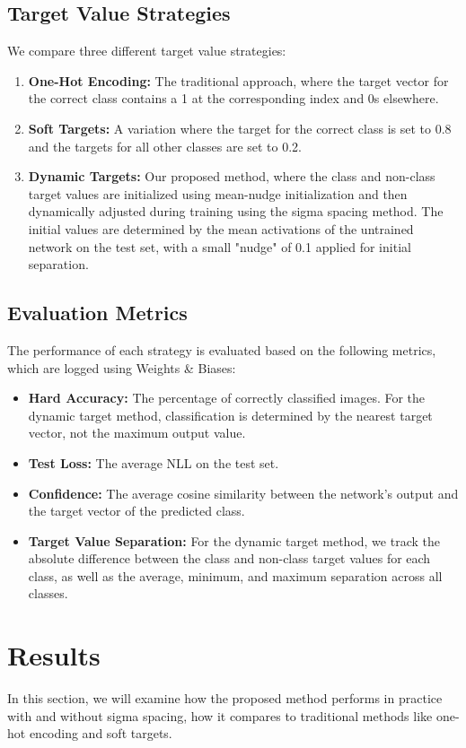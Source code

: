 \documentclass[12pt,fleqn,a4paper]{article}
\begin{document}
 \subsection{Target Value Strategies}
 We compare three different target value strategies:
 \begin{enumerate}
     \item \textbf{One-Hot Encoding:} The traditional approach, where the target vector for the correct class contains a 1 at the corresponding index and 0s elsewhere.
     \item \textbf{Soft Targets:} A variation where the target for the correct class is set to 0.8 and the targets for all other classes are set to 0.2.
     \item \textbf{Dynamic Targets:} Our proposed method, where the class and non-class target values are initialized using mean-nudge initialization and then dynamically adjusted during training using the sigma spacing method. The initial values are determined by the mean activations of the untrained network on the test set, with a small "nudge" of 0.1 applied for initial separation.
 \end{enumerate}

 \subsection{Evaluation Metrics}
 The performance of each strategy is evaluated based on the following metrics, which are logged using Weights \& Biases:
 \begin{itemize}
     \item \textbf{Hard Accuracy:} The percentage of correctly classified images. For the dynamic target method, classification is determined by the nearest target vector, not the maximum output value.
     \item \textbf{Test Loss:} The average NLL on the test set.
     \item \textbf{Confidence:} The average cosine similarity between the network's output and the target vector of the predicted class.
     \item \textbf{Target Value Separation:} For the dynamic target method, we track the absolute difference between the class and non-class target values for each class, as well as the average, minimum, and maximum separation across all classes.
 \end{itemize}

\section{Results}
In this section, we will examine how the proposed method performs in practice with and without sigma spacing, how it compares to traditional methods like one-hot encoding and soft targets.
\end{document}
